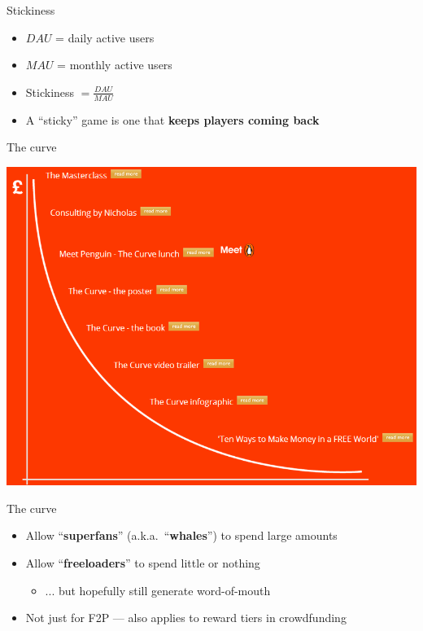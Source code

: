 \begin{frame}{Stickiness}
	\begin{itemize}
		\pause\item $DAU$ = daily active users
		\pause\item $MAU$ = monthly active users
		\pause\item Stickiness $= \frac{DAU}{MAU}$
		\pause\item A ``sticky'' game is one that \textbf{keeps players coming back}
	\end{itemize}
\end{frame}

\begin{frame}{The curve}
	\begin{center}
		\includegraphics[height=0.8\textheight]{the_curve}
	\end{center}
\end{frame}

\begin{frame}{The curve}
	\begin{itemize}
		\pause\item Allow ``\textbf{superfans}'' (a.k.a.\ ``\textbf{whales}'') to spend large amounts
		\pause\item Allow ``\textbf{freeloaders}'' to spend little or nothing
			\begin{itemize}
				\pause\item ... but hopefully still generate word-of-mouth
			\end{itemize}
		\pause\item Not just for F2P --- also applies to reward tiers in crowdfunding
	\end{itemize}
\end{frame}
